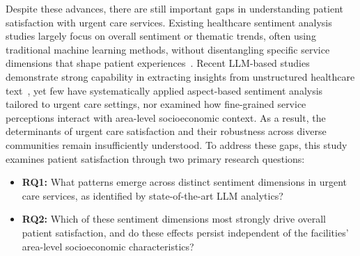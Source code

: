 \documentclass[journal,twoside,web]{ieeecolor}
\begin{document}
Despite these advances, there are still important gaps in understanding patient satisfaction with urgent care services. Existing healthcare sentiment analysis studies largely focus on overall sentiment or thematic trends, often using traditional machine learning methods, without disentangling specific service dimensions that shape patient experiences~\cite{al2014patient,howard2007patient,shah2021mining}. Recent LLM-based studies demonstrate strong capability in extracting insights from unstructured healthcare text~\cite{li2024scoping,gao2024examining,yang2022large}, yet few have systematically applied aspect-based sentiment analysis tailored to urgent care settings, nor examined how fine-grained service perceptions interact with area-level socioeconomic context. As a result, the determinants of urgent care satisfaction and their robustness across diverse communities remain insufficiently understood. To address these gaps, this study examines patient satisfaction through two primary research questions:

\begin{itemize}
\item \textbf{RQ1:} What patterns emerge across distinct sentiment dimensions in urgent care services, as identified by state-of-the-art LLM analytics?
\item \textbf{RQ2:} Which of these sentiment dimensions most strongly drive overall patient satisfaction, and do these effects persist independent of the facilities' area-level socioeconomic characteristics?
\end{itemize}
\end{document}
